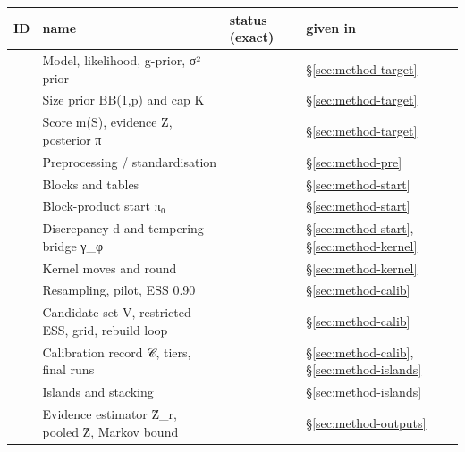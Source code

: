 {\footnotesize
\begin{xltabular}{\linewidth}{@{}l>{\raggedright\arraybackslash}X>{\raggedright\arraybackslash}p{4.2cm}>{\raggedright\arraybackslash}p{2.6cm}@{}}
\toprule
ID & name & status (exact) & given in\\
\midrule\endhead
{} & Model, likelihood, g-prior, σ² prior &  & \S\ref{sec:method-target} \\
 & Size prior BB(1,p) and cap K &  & \S\ref{sec:method-target} \\
 & Score m(S), evidence Z, posterior π &  & \S\ref{sec:method-target} \\
 & Preprocessing / standardisation &  & \S\ref{sec:method-pre} \\
 & Blocks and tables &  & \S\ref{sec:method-start} \\
 & Block-product start π₀ &  & \S\ref{sec:method-start} \\
 & Discrepancy d and tempering bridge γ\_φ &  & \S\ref{sec:method-start}, \S\ref{sec:method-kernel} \\
 & Kernel moves and round &  & \S\ref{sec:method-kernel} \\
 & Resampling, pilot, ESS 0.90 &  & \S\ref{sec:method-calib} \\
 & Candidate set V, restricted ESS, grid, rebuild loop &  & \S\ref{sec:method-calib} \\
 & Calibration record 𝒞, tiers, final runs &  & \S\ref{sec:method-calib}, \S\ref{sec:method-islands} \\
 & Islands and stacking &  & \S\ref{sec:method-islands} \\
 & Evidence estimator Ẑ\_r, pooled Ẑ, Markov bound &  & \S\ref{sec:method-outputs} \\

\end{xltabular}}
